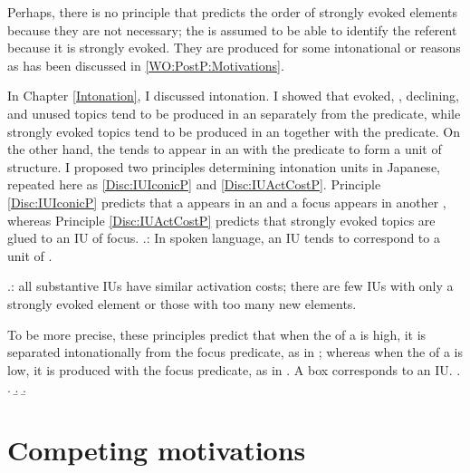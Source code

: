 Perhaps, there is no principle that predicts the order of strongly evoked elements because they are not necessary;
the  is assumed to be able to identify the referent
because it is strongly evoked.
They are produced for some intonational or  reasons
as has been discussed in \ref{WO:PostP:Motivations}.

In Chapter \ref{Intonation},
I discussed intonation.
I showed that
evoked, , declining, and unused topics tend to be produced in an  separately from the predicate,
while strongly evoked topics tend to be produced in an  together with the predicate.
On the other hand,
the  tends to appear in an  with the predicate
to form a unit of  structure.
I proposed two principles determining intonation units in Japanese,
repeated here as \ref{Disc:IUIconicP} and \ref{Disc:IUActCostP}.
Principle \ref{Disc:IUIconicP} predicts that
a  appears in an  and a focus appears in another ,
whereas Principle \ref{Disc:IUActCostP} predicts that
strongly evoked topics are glued to an IU of focus.
%
\ex.\label{Disc:IUIconicP}:
	In spoken language,
	an IU tends to correspond to a unit of .

\ex.\label{Disc:IUActCostP}:
     all substantive IUs have similar activation costs;
     there are few IUs with only a strongly evoked element or
     those with too many new elements.

To be more precise, these principles predict that
when the  of a  is high,
it is separated intonationally from the focus predicate, as in \Next[a];
whereas when the  of a  is low,
it is produced with the focus predicate, as in \Next[b-c].
A box corresponds to an IU.
%
\ex.
 \a.  
 \b. 
 \b. 

\section{Competing motivations}\label{Disc:CompMotivations}

